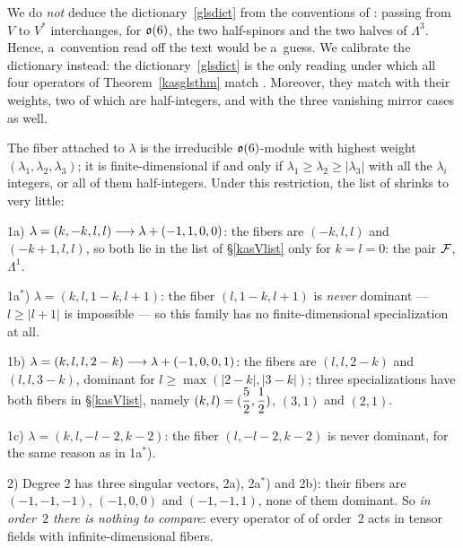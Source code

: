 \documentclass[12pt,a4paper]{amsart}
\theoremstyle{thm}
\theoremstyle{definition}
\begin{document}
We do \textit{not} deduce the dictionary~\eqref{glsdict} from the conventions of \cite{GLS}: passing from
$V$ to $V^*$ interchanges, for ${\mathfrak{o}}(6)$, the two half-spinors and the two halves of
$\Lambda^3$. Hence, a~convention read off the text would be a~guess. We calibrate the
dictionary instead: the dictionary~\eqref{glsdict} is the only reading under which all four operators of
Theorem~\ref{kasglsthm} match \cite[\S10]{GLS}. Moreover, they match with their weights, two
of which are half-integers, and with the three vanishing mirror cases as well.

\label{kasglsdom}
The fiber attached to $\lambda$ is the irreducible ${\mathfrak{o}}(6)$-module with highest weight
$(\lambda_1,\lambda_2,\lambda_3)$; it is finite-dimensional if and only if
$\lambda_1\geq\lambda_2\geq|\lambda_3|$ with all the $\lambda_i$ integers, or all of them
half-integers. Under this restriction, the list of \cite[\S10]{GLS} shrinks to very
little:

1a) $\lambda=(k,-k,l,l)\longrightarrow\lambda+(-1,1,0,0)$: the fibers are
$(-k,l,l)$ and $(-k+1,l,l)$, so both lie in the list of \S\ref{kasVlist} only for
$k=l=0$: the pair ${\mathcal F}$, $\Lambda^1$.

1a$^*$) $\lambda=(k,l,1-k,l+1)$: the fiber $(l,1-k,l+1)$ is \textit{never} dominant
--- $l\geq|l+1|$ is impossible --- so this family has no finite-dimensional
specialization at all.

1b) $\lambda=(k,l,l,2-k)\longrightarrow\lambda+(-1,0,0,1)$: the fibers are $(l,l,2-k)$ and
$(l,l,3-k)$, dominant for $l\geq\max(|2-k|,|3-k|)$; three specializations have both fibers
in \S\ref{kasVlist}, namely $(k,l)=(\nfrac52,\nfrac12)$, $(3,1)$ and $(2,1)$.

1c) $\lambda=(k,l,-l-2,k-2)$: the fiber $(l,-l-2,k-2)$ is never dominant, for the
same reason as in 1a$^*$).

2) Degree $2$ has three singular vectors, 2a), 2a$^*$) and 2b): their
fibers are
$(-1,-1,-1)$, $(-1,0,0)$ and $(-1,-1,1)$, none of them dominant. So \textit{in order~$2$
there is nothing to compare}: every operator of \cite[\S10]{GLS} of order~$2$ acts in
tensor fields with infinite-dimensional fibers.
\end{document}
